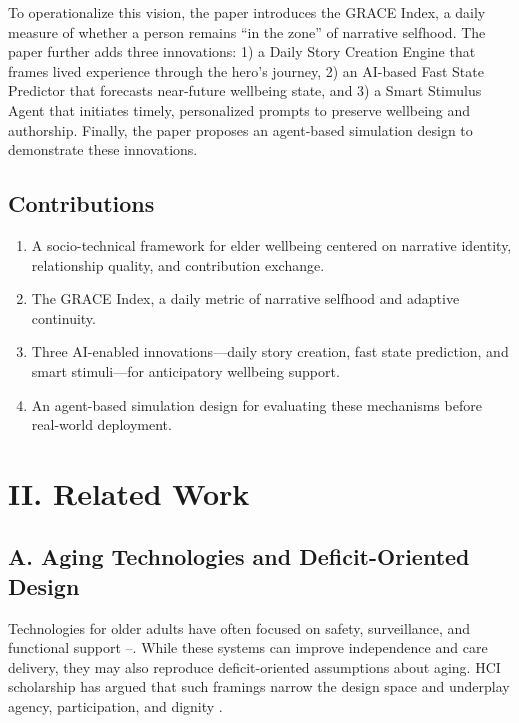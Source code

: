 \documentclass[
  journal,
]{IEEEtran}%
\providecommand{\tightlist}{%
  \setlength{\itemsep}{0pt}\setlength{\parskip}{0pt}}
\begin{document}
To operationalize this vision, the paper introduces the GRACE Index, a
daily measure of whether a person remains ``in the zone'' of narrative
selfhood. The paper further adds three innovations: 1) a Daily Story
Creation Engine that frames lived experience through the hero's journey,
2) an AI-based Fast State Predictor that forecasts near-future wellbeing
state, and 3) a Smart Stimulus Agent that initiates timely, personalized
prompts to preserve wellbeing and authorship. Finally, the paper
proposes an agent-based simulation design to demonstrate these
innovations.

\subsection{Contributions}\label{contributions}

\begin{enumerate}
\def\labelenumi{\arabic{enumi}.}
\tightlist
\item
  A socio-technical framework for elder wellbeing centered on narrative
  identity, relationship quality, and contribution exchange.
\item
  The GRACE Index, a daily metric of narrative selfhood and adaptive
  continuity.
\item
  Three AI-enabled innovations---daily story creation, fast state
  prediction, and smart stimuli---for anticipatory wellbeing support.
\item
  An agent-based simulation design for evaluating these mechanisms
  before real-world deployment.
\end{enumerate}

\section{II. Related Work}\label{ii.-related-work}

\subsection{A. Aging Technologies and Deficit-Oriented
Design}\label{a.-aging-technologies-and-deficit-oriented-design}

Technologies for older adults have often focused on safety,
surveillance, and functional support
--.
While these systems can improve independence and care delivery, they may
also reproduce deficit-oriented assumptions about aging. HCI scholarship
has argued that such framings narrow the design space and underplay
agency, participation, and dignity .
\end{document}
